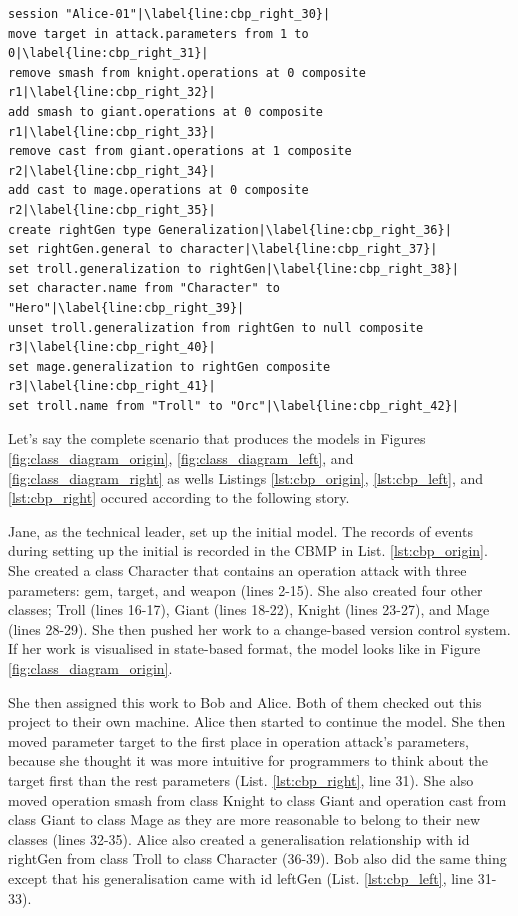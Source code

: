 \begin{lstlisting}[firstnumber=30,style=eol,escapechar=|,caption={The appended events made by Alice to produce the right version in Figure \ref{fig:class_diagram_right} (right version).},label=lst:cbp_right]
session "Alice-01"|\label{line:cbp_right_30}|
move target in attack.parameters from 1 to 0|\label{line:cbp_right_31}|
remove smash from knight.operations at 0 composite r1|\label{line:cbp_right_32}|
add smash to giant.operations at 0 composite r1|\label{line:cbp_right_33}|
remove cast from giant.operations at 1 composite r2|\label{line:cbp_right_34}|
add cast to mage.operations at 0 composite r2|\label{line:cbp_right_35}|
create rightGen type Generalization|\label{line:cbp_right_36}|
set rightGen.general to character|\label{line:cbp_right_37}|
set troll.generalization to rightGen|\label{line:cbp_right_38}|
set character.name from "Character" to "Hero"|\label{line:cbp_right_39}|
unset troll.generalization from rightGen to null composite r3|\label{line:cbp_right_40}|
set mage.generalization to rightGen composite r3|\label{line:cbp_right_41}|
set troll.name from "Troll" to "Orc"|\label{line:cbp_right_42}|
\end{lstlisting}

Let's say the complete scenario that produces the models in Figures \ref{fig:class_diagram_origin}, \ref{fig:class_diagram_left}, and \ref{fig:class_diagram_right} as wells Listings \ref{lst:cbp_origin}, \ref{lst:cbp_left}, and \ref{lst:cbp_right} occured according to the following story.

Jane, as the technical leader, set up the initial model. The records of events during setting up the initial is recorded in the CBMP in List. \ref{lst:cbp_origin}. She created a class \textsf{Character} that contains an operation \textsf{attack} with three parameters: \textsf{gem}, \textsf{target}, and \textsf{weapon} (lines 2-15). She also created four other classes; \textsf{Troll} (lines 16-17), \textsf{Giant} (lines 18-22), \textsf{Knight} (lines 23-27), and \textsf{Mage} (lines 28-29). She then pushed her work to a change-based version control system. If her work is visualised in state-based format, the model looks like in Figure \ref{fig:class_diagram_origin}.

She then assigned this work to Bob and Alice. Both of them checked out this project to their own machine. Alice then started to continue the model. She then moved parameter \textsf{target} to the first place in operation \textsf{attack}'s parameters, because she thought it was more intuitive for programmers to think about the \textsf{target} first than the rest parameters (List. \ref{lst:cbp_right}, line 31). She also moved operation \textsf{smash} from class \textsf{Knight} to class \textsf{Giant} and operation \textsf{cast} from class \textsf{Giant} to class \textsf{Mage} as they are more reasonable to belong to their new classes (lines 32-35). Alice also created a generalisation relationship with id \textsf{rightGen} from class \textsf{Troll} to class \textsf{Character} (36-39). Bob also did the same thing except that his generalisation came with id \textsf{leftGen} (List. \ref{lst:cbp_left}, line 31-33). 

